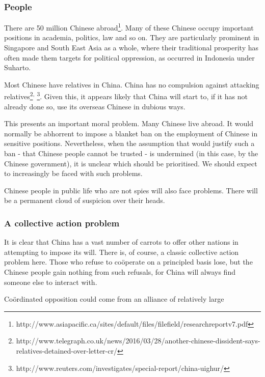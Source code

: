 \documentclass[11pt,a4paper]{report}
\begin{document}
\subsubsection{People}\label{people}

\begin{multicols}{2}

There are 50 million Chinese abroad\footnote{http://www.asiapacific.ca/sites/default/files/filefield/researchreportv7.pdf}.
Many of these Chinese occupy important positions in academia, politics,
law and so on. They are particularly prominent in Singapore and South
East Asia as a whole, where their traditional prosperity has often made
them targets for political oppression, as occurred in Indonesia under
Suharto.

Most Chinese have relatives in China. China has no compulsion against
attacking relatives\footnote{http://www.telegraph.co.uk/news/2016/03/28/another-chinese-dissident-says-relatives-detained-over-letter-cr/}\textsuperscript{,}
\footnote{http://www.reuters.com/investigates/special-report/china-uighur/}.
Given this, it appears likely that China will start to, if it has not
already done so, use its overseas Chinese in dubious ways.

This presents an important moral problem. Many Chinese live abroad. It
would normally be abhorrent to impose a blanket ban on the employment of
Chinese in sensitive positions. Nevertheless, when the assumption that
would justify such a ban - that Chinese people cannot be trusted - is
undermined (in this case, by the Chinese government), it is unclear
which should be prioritised. We should expect to increasingly be faced
with such problems.

Chinese people in public life who are not spies will also face problems.
There will be a permanent cloud of suspicion over their heads.

\end{multicols}


\subsubsection{A collective action
	problem}\label{a-collective-action-problem}

\begin{multicols}{2}
	
It is clear that China has a vast number of carrots to offer other
nations in attempting to impose its will. There is, of course, a classic
collective action problem here. Those who refuse to coöperate on a
principled basis lose, but the Chinese people gain nothing from such
refusals, for China will always find someone else to interact with.

Coördinated opposition could come from an alliance of relatively large

\end{multicols}
\end{document}
